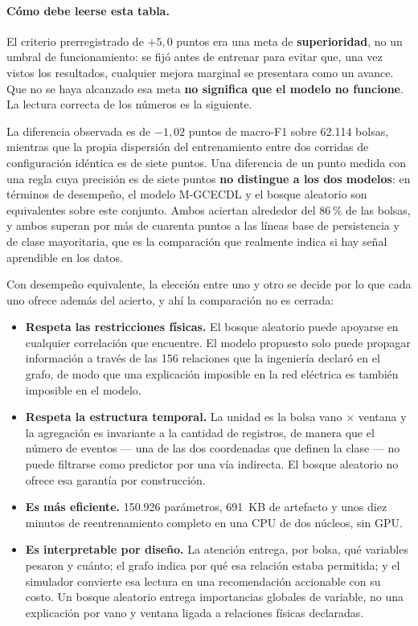 \documentclass[11pt,a4paper]{article}
\begin{document}
\begin{bloquenuevo}
\paragraph{Cómo debe leerse esta tabla.} El criterio prerregistrado de $+5{,}0$ puntos era una
meta de \textbf{superioridad}, no un umbral de funcionamiento: se fijó antes de entrenar para
evitar que, una vez vistos los resultados, cualquier mejora marginal se presentara como un
avance. Que no se haya alcanzado esa meta \textbf{no significa que el modelo no funcione}. La
lectura correcta de los números es la siguiente.

La diferencia observada es de $-1{,}02$ puntos de macro-F1 sobre 62.114 bolsas, mientras que la
propia dispersión del entrenamiento entre dos corridas de configuración idéntica es de siete
puntos. Una diferencia de un punto medida con una regla cuya precisión es de siete puntos
\textbf{no distingue a los dos modelos}: en términos de desempeño, el modelo M-GCECDL y el
bosque aleatorio son equivalentes sobre este conjunto. Ambos aciertan alrededor del 86\,\% de
las bolsas, y ambos superan por más de cuarenta puntos a las líneas base de persistencia y de
clase mayoritaria, que es la comparación que realmente indica si hay señal aprendible en los
datos.

Con desempeño equivalente, la elección entre uno y otro se decide por lo que cada uno ofrece
además del acierto, y ahí la comparación no es cerrada:

\begin{itemize}
  \item \textbf{Respeta las restricciones físicas.} El bosque aleatorio puede apoyarse en
        cualquier correlación que encuentre. El modelo propuesto solo puede propagar
        información a través de las 156 relaciones que la ingeniería declaró en el grafo, de
        modo que una explicación imposible en la red eléctrica es también imposible en el
        modelo.
  \item \textbf{Respeta la estructura temporal.} La unidad es la bolsa vano $\times$ ventana y
        la agregación es invariante a la cantidad de registros, de manera que el número de
        eventos --- una de las dos coordenadas que definen la clase --- no puede filtrarse
        como predictor por una vía indirecta. El bosque aleatorio no ofrece esa garantía por
        construcción.
  \item \textbf{Es más eficiente.} 150.926 parámetros, 691~KB de artefacto y unos diez minutos
        de reentrenamiento completo en una CPU de dos núcleos, sin GPU.
  \item \textbf{Es interpretable por diseño.} La atención entrega, por bolsa, qué variables
        pesaron y cuánto; el grafo indica por qué esa relación estaba permitida; y el simulador
        convierte esa lectura en una recomendación accionable con su costo. Un bosque aleatorio
        entrega importancias globales de variable, no una explicación por vano y ventana ligada
        a relaciones físicas declaradas.
\end{itemize}


\end{bloquenuevo}
\end{document}
